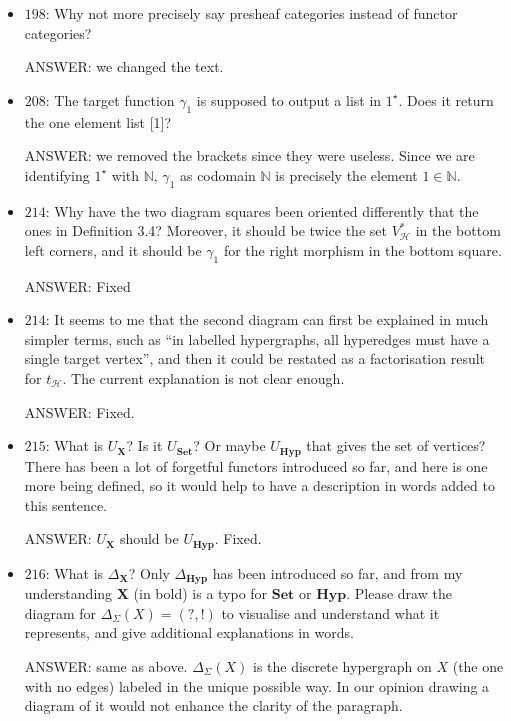 \documentclass[english,11pt,a4paper]{article}
\begin{document}
\begin{itemize}
\item $198$: Why not more precisely say presheaf categories instead of functor categories?

ANSWER: we changed the text.

\item $208$: The target function $\gamma_1$ is supposed to output a list in $1^\star$. Does it return the one element list [1]?

ANSWER: we removed the brackets since they were useless. Since we are identifying $1^\star$ with $\mathbb{N}$, $\gamma_1$ as codomain $\mathbb{N}$ is precisely the element $1\in \mathbb{N}$.

\item $214$: Why have the two diagram squares been oriented differently that the ones in Definition 3.4? Moreover, it should be twice the set $V_\mathcal{H}^*$ in the bottom left corners, and it should be $\gamma_1$ for the right morphism in the bottom square.

ANSWER: Fixed

 \item $214$: It seems to me that the second diagram can first be explained in much simpler terms, such as ``in labelled hypergraphs, all hyperedges must have a single target vertex'', and then it could be restated as a factorisation result for $t_\mathcal{H}$. The current explanation is not clear enough.
 
 ANSWER: Fixed.
 
 \item $215$: What is $U_{\mathbf{X}}$? Is it $U_{\mathbf{Set}}$? Or maybe $U_{\mathbf{Hyp}}$ that gives the set of vertices? There has been a lot of forgetful functors introduced so far, and here is one more being defined, so it would help to have a description in words added to this sentence.
 
 ANSWER: $U_{\mathbf{X}}$ should be $U_{\mathbf{Hyp}}$. Fixed.
 
 \item $216$: What is $\Delta_{\mathbf{X}}$? Only $\Delta_{\mathbf{Hyp}}$ has been introduced so far, and from my understanding $\mathbf{X}$ (in bold) is a typo for $\mathbf{Set}$ or $\mathbf{Hyp}$. Please draw the diagram for $\Delta_\Sigma(X) = (?,!)$ to visualise and understand what it represents, and give additional explanations in words. 

ANSWER: same as above. $\Delta_\Sigma(X)$ is the discrete hypergraph on $X$ (the one with no edges) labeled in the unique possible way. In our opinion drawing a diagram of it would not enhance the clarity of the paragraph.


\end{itemize}
\end{document}

